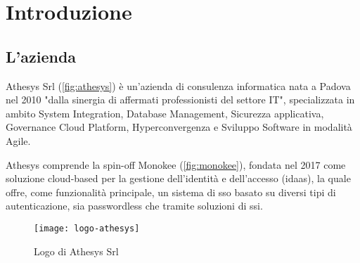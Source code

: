 
\chapter{Introduzione}
\label{cap:introduzione}







\section{L'azienda}

Athesys Srl (\autoref{fig:athesys}) è un'azienda di consulenza informatica nata a Padova nel 2010 "dalla sinergia di affermati professionisti del settore IT"\cite{site:athesys}, specializzata in ambito System Integration, Database Management, Sicurezza applicativa, Governance Cloud Platform, Hyperconvergenza e
Sviluppo Software in modalità Agile.

Athesys comprende la spin-off Monokee\cite{site:monokee} (\autoref{fig:monokee}), fondata nel 2017 come soluzione cloud-based per la gestione dell'identità
e dell'accesso (\acrfull{idaas}), la quale offre, come funzionalità principale, un sistema di \acrshort{sso} basato 
su diversi tipi di autenticazione, sia passwordless che tramite soluzioni di \acrfull{ssi}.

\vspace{20pt}
\begin{figure}[H] 
    \centering 
    \texttt{[image: logo-athesys]} 
    \caption{Logo di Athesys Srl}
    \label{fig:athesys}
\end{figure}


